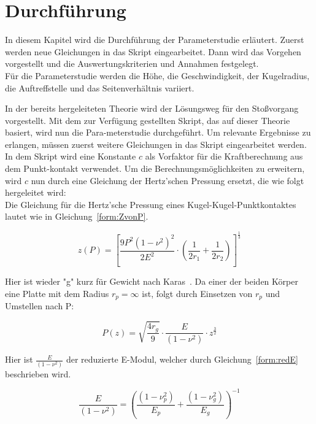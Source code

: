 \chapter{Durchführung}
\label{chap:Durchfuehrung}

In diesem Kapitel wird die Durchführung der Parameterstudie erläutert. Zuerst werden neue Gleichungen in das Skript eingearbeitet. Dann wird das Vorgehen vorgestellt und die Auswertungskriterien und Annahmen festgelegt.\\
Für die Parameterstudie werden die Höhe, die Geschwindigkeit, der Kugelradius, die Auftreffstelle und das Seitenverhältnis variiert.

In der bereits hergeleiteten Theorie wird der Lösungsweg für den Stoßvorgang vorgestellt. Mit dem zur Verfügung gestellten Skript, das auf dieser Theorie basiert, wird nun die Para-meterstudie durchgeführt. Um relevante Ergebnisse zu erlangen, müssen zuerst weitere Gleichungen in das Skript eingearbeitet werden.\\
In dem Skript wird eine Konstante $c$ als Vorfaktor für die Kraftberechnung aus dem Punkt-kontakt verwendet. Um die Berechnungsmöglichkeiten zu erweitern, wird $c$ nun durch eine Gleichung der Hertz'schen Pressung ersetzt, die wie folgt hergeleitet wird:\\

Die Gleichung für die Hertz'sche Pressung eines Kugel-Kugel-Punktkontaktes lautet wie in Gleichung~\ref{form:ZvonP}.

\begin{equation}
	\label{form:ZvonP}
	z(P) = \left[ \frac{9 P^{2} (1 - \nu^{2})^{2}}{2 E^{2}} \cdot \left( \frac{1}{2 r_{1}} + \frac{1}{2 r_{2}} \right) \right]^{\frac{1}{3}}
\end{equation}

Hier ist wieder "g" kurz für Gewicht nach Karas~\cite{Karas.1939}. Da einer der beiden Körper eine Platte mit dem Radius $r_{p} = \infty$ ist, folgt durch Einsetzen von $r_{p}$ und Umstellen nach P:

\begin{equation}
	\label{form:PvonZ}
	P(z) = \sqrt{\frac{4 r_{g}}{9}} \cdot \frac{E}{(1 - \nu^{2})} \cdot z^{\frac{3}{2}}
\end{equation}
	
Hier ist $\frac{E}{(1 - \nu^{2})}$ der reduzierte E-Modul, welcher durch Gleichung~\ref{form:redE} beschrieben wird.

\begin{equation}
	\label{form:redE}
	\frac{E}{(1 - \nu^{2})} = \left( \frac{(1 - \nu_{p}^{2})}{E_{p}} + \frac{(1 - \nu_{g}^{2})}{E_{g}} \right)^{-1}
\end{equation} 

